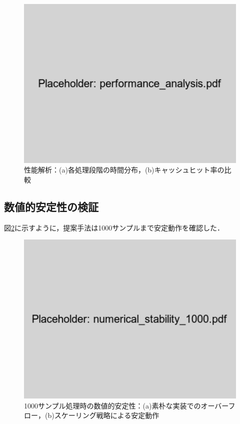 \documentclass[paper]{ieice}
\begin{document}
\begin{figure}[t]
\centering
\includegraphics[width=0.85\linewidth]{performance_analysis.pdf}
\caption{性能解析：(a)各処理段階の時間分布，(b)キャッシュヒット率の比較}
\label{fig:performance_analysis}
\end{figure}

\subsection{数値的安定性の検証}

図\ref{fig:stability}に示すように，提案手法は1000サンプルまで安定動作を確認した．

\begin{figure}[t]
\centering
\includegraphics[width=0.85\linewidth]{numerical_stability_1000.pdf}
\caption{1000サンプル処理時の数値的安定性：(a)素朴な実装でのオーバーフロー，(b)スケーリング戦略による安定動作}
\label{fig:stability}
\end{figure}
\end{document}
